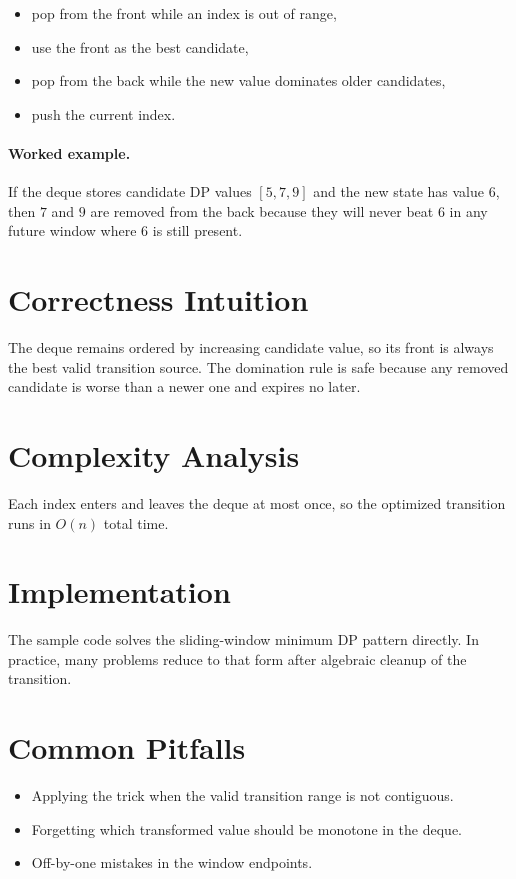 \begin{itemize}
  \item pop from the front while an index is out of range,
  \item use the front as the best candidate,
  \item pop from the back while the new value dominates older candidates,
  \item push the current index.
\end{itemize}

\paragraph{Worked example.}
If the deque stores candidate DP values \([5, 7, 9]\) and the new state has value \(6\), then \(7\) and \(9\) are
removed from the back because they will never beat \(6\) in any future window where \(6\) is still present.

\section*{Correctness Intuition}

The deque remains ordered by increasing candidate value, so its front is always the best valid transition source. The
domination rule is safe because any removed candidate is worse than a newer one and expires no later.

\section*{Complexity Analysis}

Each index enters and leaves the deque at most once, so the optimized transition runs in \(O(n)\) total time.

\section*{Implementation}

The sample code solves the sliding-window minimum DP pattern directly. In practice, many problems reduce to that form
after algebraic cleanup of the transition.

\section*{Common Pitfalls}

\begin{itemize}
  \item Applying the trick when the valid transition range is not contiguous.
  \item Forgetting which transformed value should be monotone in the deque.
  \item Off-by-one mistakes in the window endpoints.
\end{itemize}

